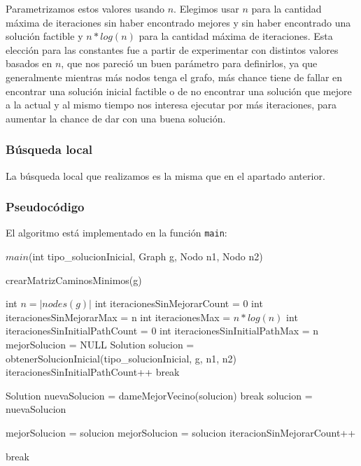 Parametrizamos estos valores usando $n$. Elegimos usar $n$ para la cantidad máxima de iteraciones sin haber encontrado mejores y sin haber encontrado una solución factible y $n*log(n)$ para la cantidad máxima de iteraciones. Esta elección para las constantes fue a partir de experimentar con distintos valores basados en $n$, que nos pareció un buen parámetro para definirlos, ya que generalmente mientras más nodos tenga el grafo, más chance tiene de fallar en encontrar una solución inicial factible o de no encontrar una solución que mejore a la actual y al mismo tiempo nos interesa ejecutar por más iteraciones, para aumentar la chance de dar con una buena solución. 

\subsubsection{Búsqueda local}

La búsqueda local que realizamos es la misma que en el apartado anterior.

\subsubsection{Pseudocódigo}

El algoritmo está implementado en la función \texttt{main}:

\begin{algorithm}[H]
\caption{$main$(int tipo\_solucionInicial, Graph g, Nodo n1, Nodo n2)}
\begin{algorithmic}[1]
  \State crearMatrizCaminosMinimos(g)
  
  \State int $n = |nodes(g)|$
  \State int iteracionesSinMejorarCount = 0
  \State int iteracionesSinMejorarMax = n
  \State int iteracionesMax = $n * log(n)$
  \State int iteracionesSinInitialPathCount = 0
  \State int iteracionesSinInitialPathMax = n
  \State mejorSolucion = NULL
  	\State Solution solucion = obtenerSolucionInicial(tipo\_solucionInicial, g, n1, n2)	
    		\State iteracionesSinInitialPathCount++
			break
		\EndIf
        \EndIf

  
	    	\State Solution nuevaSolucion = dameMejorVecino(solucion)
			\State break	
		\EndIf    
		\State solucion = nuevaSolucion	
	    \EndWhile
	  
	  	\State mejorSolucion = solucion
	  	\State mejorSolucion = solucion
	  \Else
	  	\State iteracionSinMejorarCount++
	  \EndIf
	\EndIf
	
                \State break
        \EndIf
	  
    \EndFor
\end{algorithmic}
\end{algorithm}

